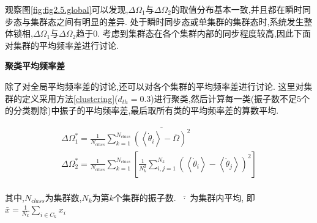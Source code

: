 \documentclass{article}
\begin{document}
观察图\ref{fig:fig2.5.global}可以发现,$\Delta \Omega _1$与$\Delta \Omega _2$的取值分布基本一致,并且都在瞬时同步态与集群态之间有明显的差异. 处于瞬时同步态或单集群的集群态时,系统发生整体锁相,$\Delta\Omega_1$与$\Delta\Omega_2$趋于0. 考虑到集群态在各个集群内部的同步程度较高,因此下面对集群的平均频率差进行讨论.

\newpage
\noindent\textbf{聚类平均频率差}

除了对全局平均频率差的讨论,还可以对各个集群的平均频率差进行讨论. 这里对集群的定义采用方法\ref{clustering}($d_{th}=0.3$)进行聚类,然后计算每一类(振子数不足5个的分类剔除)中振子的平均频率差,最后取所有类的平均频率差的算数平均.

$$
\begin{array}{l}
	\Delta \Omega _{1}^{*}=\frac{1}{N_{class}}\sum_{k=1}^{N_{class}}{\overline{\left( \left< \dot{\theta}_i \right> -\bar{\Omega} \right) ^2}}\\
	\Delta \Omega _{2}^{*}=\frac{1}{N_{class}}\sum_{k=1}^{N_{class}}{\left[ \frac{1}{N_{k}^{2}}\sum_{i,j=1}^{N_k}{\left( \left< \dot{\theta}_i \right> -\left< \dot{\theta}_j \right> \right) ^2} \right]}\\
\end{array}
$$

其中,$N_{class}$为集群数,$N_k$为第$k$个集群的振子数. $\overline{\,\,\cdot \,\,}$为集群内平均, 即$\bar{x}=\frac{1}{N_k}\sum_{i\in C_k}{x_i}$
\end{document}
